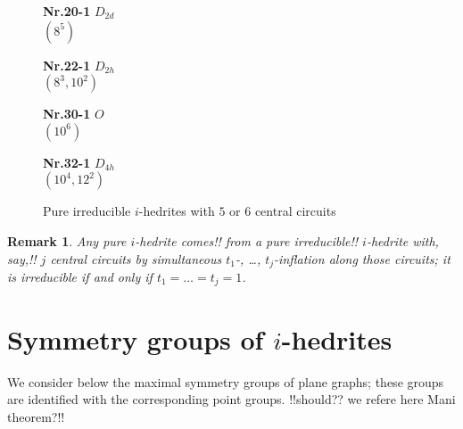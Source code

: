 \documentclass[12pt]{article}
\newtheorem{remark}{Remark}
\begin{document}
\begin{figure}
{\small
\setlength{\unitlength}{1cm}
\begin{minipage}[t]{3.5cm}
\centering
\epsfxsize=2.5cm
\par
{{\bf Nr.20-1} \quad $D_{2d}$ \\ $(8^5)$ \\ }
\end{minipage}
\begin{minipage}[t]{3.5cm}
\centering
\epsfxsize=2.5cm
\par
{{\bf Nr.22-1} \quad $D_{2h}$ \\ $(8^3,10^2)$ \\ }
\end{minipage}
\setlength{\unitlength}{1cm}
\begin{minipage}[t]{3.5cm}
\centering
\epsfxsize=2.3cm
\par
{{\bf Nr.30-1} \quad $O$ \\ $(10^6)$ \\}
\end{minipage}
\setlength{\unitlength}{1cm}
\begin{minipage}[t]{3.5cm}
\centering
\epsfxsize=2.3cm
\par
{{\bf Nr.32-1} \quad $D_{4h}$ \\ $(10^4,12^2)$ \\}
\end{minipage}
}
\caption{Pure irreducible $i$-hedrites with $5$ or $6$ central circuits}
\label{ThePureIrreducibleOctahedriteWith56CC}
\end{figure}







\begin{remark}

Any pure $i$-hedrite comes!! from a pure {\em irreducible}!! $i$-hedrite 
with, say,!! $j$ central circuits by simultaneous $t_1$-, \dots, $t_j$-inflation along those circuits; it is irreducible if and only if $t_1=\dots=t_j=1$.

\end{remark}






\section{Symmetry groups of $i$-hedrites}
We consider below the maximal symmetry groups of plane graphs; these groups are identified with the corresponding point groups.
!!should?? we refere here Mani theorem?!!
\end{document}
